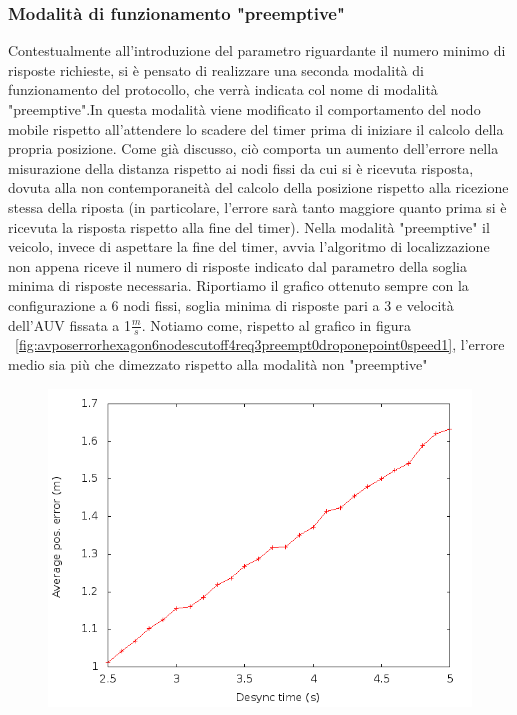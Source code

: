 \documentclass[Lau,binding=0.6cm]{sapthesis}
\begin{document}
\subsubsection{Modalità di funzionamento "preemptive"}
Contestualmente all'introduzione del parametro riguardante il numero minimo di risposte richieste, si è pensato di realizzare una seconda modalità di funzionamento del protocollo, che verrà indicata col nome di modalità  "preemptive".\newline In questa modalità viene modificato il  comportamento del nodo mobile rispetto all'attendere lo scadere del timer prima di iniziare il calcolo della propria posizione. Come già discusso, ciò comporta un aumento dell'errore nella misurazione della distanza rispetto ai nodi fissi da cui si è ricevuta risposta, dovuta alla non contemporaneità del calcolo della posizione rispetto alla ricezione stessa della riposta (in particolare, l'errore sarà tanto maggiore quanto prima si è ricevuta la risposta rispetto alla fine del timer).\newline
Nella modalità "preemptive" il veicolo, invece di aspettare la fine del timer,  avvia l'algoritmo di localizzazione non appena riceve il numero di risposte indicato dal parametro della soglia minima di risposte necessaria.
Riportiamo il grafico ottenuto sempre con la configurazione a 6 nodi fissi, soglia minima di risposte pari a 3 e velocità dell'AUV fissata a 1$\frac{m}{s}$. Notiamo come, rispetto al grafico in figura ~\ref{fig:avposerrorhexagon6nodescutoff4req3preempt0droponepoint0speed1}, l'errore medio sia più che dimezzato rispetto alla modalità non "preemptive"
\begin{figure}[H]
    \includegraphics[scale=0.5]{avposerrorhexagon6nodescutoff4req3preempt1droponepoint0speed1.png}
    \centering
\end{figure}
\end{document}
